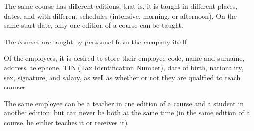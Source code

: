 \documentclass{article}
\numberwithin{figure}{section}
\begin{document}
The same course has different editions, that is, it is taught in different places, dates, and with different schedules (intensive, morning, or afternoon).  On the same start date, only one edition of a course can be taught.

The courses are taught by personnel from the company itself.

Of the employees, it is desired to store their employee code, name and surname, address, telephone, TIN (Tax Identification Number), date of birth, nationality, sex, signature, and salary, as well as whether or not they are qualified to teach courses.

The same employee can be a teacher in one edition of a course and a student in another edition, but can never be both at the same time (in the same edition of a course, he either teaches it or receives it).

\end{document}
